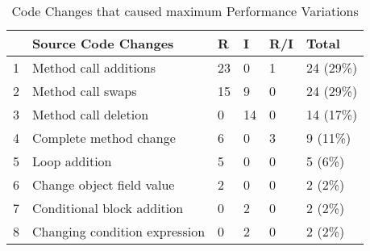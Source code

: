 \documentclass[article,type=msc,colorback,12pt,accentcolor=tud8b,table]{tudthesis}
\begin{document}
\begin{enumerate}
\begin{table}[]
	\centering
	\caption{Code Changes that caused maximum Performance Variations \cite{sandoval2016learning}}
	\label{tab:Table2}
	\begin{tabular}{|l|l|l|l|l|l|}
		\hline
		& \cellcolor[HTML]{FFD27F}\textbf{Source Code Changes} & \cellcolor[HTML]{FFD27F}\textbf{R} & \cellcolor[HTML]{FFD27F}\textbf{I} & \cellcolor[HTML]{FFD27F}\textbf{R/I} & \cellcolor[HTML]{FFD27F}\textbf{Total} \\ \hline
		1  & Method call additions                                & 23                                 & 0                                  & 1                                    & 24 (29\%)                              \\ \hline
		2  & Method call swaps                                    & 15                                 & 9                                  & 0                                    & 24 (29\%)                              \\ \hline
		3  & Method call deletion                                 & 0                                  & 14                                 & 0                                    & 14 (17\%)                              \\ \hline
		4  & Complete method change                               & 6                                  & 0                                  & 3                                    & 9 (11\%)                               \\ \hline
		5  & Loop addition                                        & 5                                  & 0                                  & 0                                    & 5 (6\%)                                \\ \hline
		6  & Change object field value                            & 2                                  & 0                                  & 0                                    & 2 (2\%)                                \\ \hline
		7  & Conditional block addition                           & 0                                  & 2                                  & 0                                    & 2 (2\%)                                \\ \hline
		8  & Changing condition expression                        & 0                                  & 2                                  & 0                                    & 2 (2\%)                                \\ \hline

\end{tabular}
\end{table}
\end{enumerate}
\end{document}
